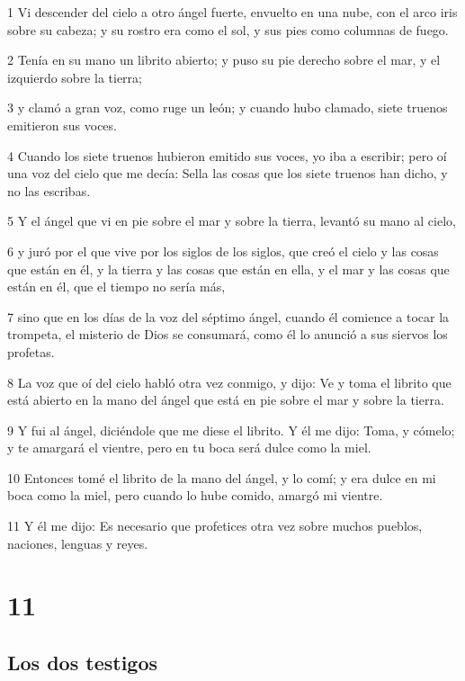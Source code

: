 \par 1 Vi descender del cielo a otro ángel fuerte, envuelto en una nube, con el arco iris sobre su cabeza; y su rostro era como el sol, y sus pies como columnas de fuego.
\par 2 Tenía en su mano un librito abierto; y puso su pie derecho sobre el mar, y el izquierdo sobre la tierra;
\par 3 y clamó a gran voz, como ruge un león; y cuando hubo clamado, siete truenos emitieron sus voces.
\par 4 Cuando los siete truenos hubieron emitido sus voces, yo iba a escribir; pero oí una voz del cielo que me decía: Sella las cosas que los siete truenos han dicho, y no las escribas.
\par 5 Y el ángel que vi en pie sobre el mar y sobre la tierra, levantó su mano al cielo,
\par 6 y juró por el que vive por los siglos de los siglos, que creó el cielo y las cosas que están en él, y la tierra y las cosas que están en ella, y el mar y las cosas que están en él, que el tiempo no sería más,
\par 7 sino que en los días de la voz del séptimo ángel, cuando él comience a tocar la trompeta, el misterio de Dios se consumará, como él lo anunció a sus siervos los profetas.
\par 8 La voz que oí del cielo habló otra vez conmigo, y dijo: Ve y toma el librito que está abierto en la mano del ángel que está en pie sobre el mar y sobre la tierra.
\par 9 Y fui al ángel, diciéndole que me diese el librito. Y él me dijo: Toma, y cómelo; y te amargará el vientre, pero en tu boca será dulce como la miel.
\par 10 Entonces tomé el librito de la mano del ángel, y lo comí; y era dulce en mi boca como la miel, pero cuando lo hube comido, amargó mi vientre.
\par 11 Y él me dijo: Es necesario que profetices otra vez sobre muchos pueblos, naciones, lenguas y reyes.

\chapter{11}

\section*{Los dos testigos}

